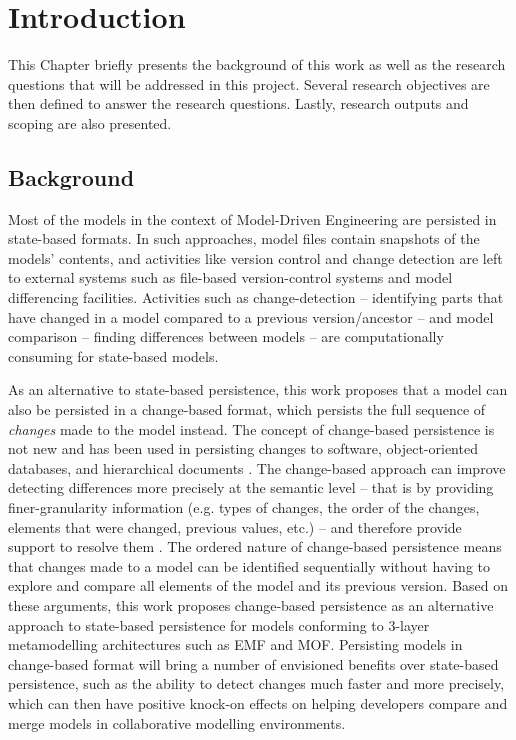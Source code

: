 \documentclass[12pt, a4paper]{report} \usepackage[titletoc]{appendix}
\begin{document}
\tableofcontents
{}


\listoftables
\newpage


\chapter{Introduction}
\label{ch:introduction}
This Chapter briefly presents the background of this work as well as the research questions that will be addressed in this project. Several research objectives are then defined to answer the research questions. Lastly, research outputs and scoping are also presented. 

\section{Background}
\label{sec:background}
Most of the models in the context of Model-Driven Engineering are persisted in state-based formats. In such approaches, model files contain snapshots of the models' contents, and activities like version control and change detection are left to external systems such as file-based version-control systems and model differencing facilities. Activities such as change-detection -- identifying parts that have changed in a model compared to a previous version/ancestor -- and model comparison -- finding differences between models -- are computationally consuming for state-based models.

As an alternative to state-based persistence, this work proposes that a model can also be persisted in a change-based format, which persists the full sequence of \emph{changes} made to the model instead. The concept of change-based persistence is not new and has been used in persisting changes to software, object-oriented databases, and hierarchical documents \cite{DBLP:journals/entcs/RobbesL07,DBLP:conf/sde/LippeO92,DBLP:conf/caise/IgnatN05}. The change-based approach can improve detecting differences more precisely at the semantic level -- that is by providing finer-granularity information (e.g. types of changes, the order of the changes, elements that were changed, previous values, etc.) -- and therefore provide support to resolve them \cite{mens2002state}. The ordered nature of change-based persistence means that changes made to a model can be identified sequentially without having to explore and compare all elements of the model and its previous version. Based on these arguments, this work proposes change-based persistence as an alternative approach to state-based persistence for models conforming to 3-layer metamodelling architectures such as EMF and MOF. Persisting models in change-based format will bring a number of envisioned benefits over state-based persistence, such as the ability to detect changes much faster and more precisely, which can then have positive knock-on effects on helping developers compare and merge models in collaborative modelling environments. 
\end{document}
